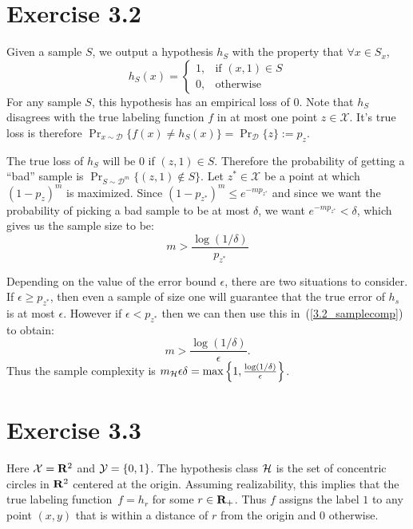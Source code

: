 \section*{Exercise 3.2}

Given a sample $S$, we output a hypothesis $h_S$ with the property that 
$\forall x \in S_x$, 
\[
    h_S(x) = \left \{ \begin{array}{rl} 
                            1, & \text{if $(x, 1) \in S$} \\
                            0, & \text{otherwise}
                      \end{array} \right .
\]
For any sample $S$, this hypothesis has an empirical loss of $0$. Note 
that $h_S$ disagrees with the true labeling function $f$ in at most one point 
$z \in \mathcal{X}$. It's true loss is therefore 
$\Pr_{x \sim \mathcal{D}} \{ f(x) \neq h_S(x)\} = \Pr_{\mathcal{D}} \{z\} := p_z$. 

The true loss of $h_S$ will be $0$ if $(z, 1) \in S$. Therefore the probability 
of getting a ``bad'' sample is $\Pr_{S \sim \mathcal{D}^m}\{(z, 1) \notin S\}$.
Let $z^{*} \in \mathcal{X}$ be a point at which $(1 - p_z)^m$ is maximized. Since 
$(1 - p_{z^{*}})^m \leq e^{- m p_{z^{*}}}$ and since we want the probability of 
picking a bad sample to be at most $\delta$, we want $e^{- m p_{z^{*}}} < \delta$,
which gives us the sample size to be:
\begin{equation}
\label{3.2_samplecomp}
	m  > \frac{\log (1 / \delta)}{p_{z^{*}}}
\end{equation}

Depending on the value of the error bound $\epsilon$, there are two situations
to consider. If $\epsilon \geq p_{z^{*}}$, then even a sample of size one will
guarantee that the true error of $h_s$ is at most $\epsilon$. However if 
$\epsilon < p_{z^{*}}$ then we can then use this in~(\ref{3.2_samplecomp})
to obtain: 
\[
    m > \frac{\log (1 / \delta)}{\epsilon}.
\]
Thus the sample complexity is $m_{\mathcal{H}}{\epsilon}{\delta} = 
\max \left \{1, \frac{\log (1 / \delta)}{\epsilon} \right \}$.

\section*{Exercise 3.3}

Here $\mathcal{X} = \mathbf{R}^2$ and $\mathcal{Y} = \{0, 1\}$. The hypothesis class $\mathcal{H}$
is the set of concentric circles in $\mathbf{R}^2$ centered at the origin. Assuming
realizability, this implies that the true labeling function~$f = h_r$ for some
$r \in \mathbf{R}_{+}$. Thus $f$ assigns the label $1$ to any point $(x, y) $ that is
within a distance of $r$ from the origin and $0$ otherwise. 

